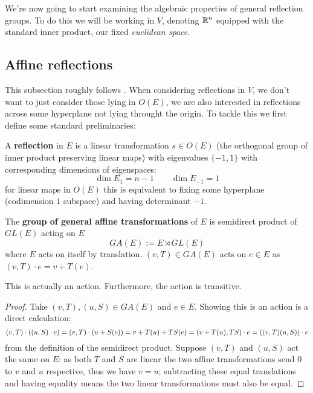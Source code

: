 \documentclass[../main.tex]{subfiles}
\begin{document}
We're now going to start examining the algebraic properties of general reflection groups. To do this we will be working in $V$, denoting $\mathbb{R}^n$ equipped with the standard inner product, our fixed \textit{euclidean space}.

\subsection{Affine reflections}

This subsection roughly follows \cite{Berger2009}. When considering reflections in $V$, we don't want to just consider those lying in $O(E)$, we are also interested in reflections across some hyperplane not lying throught the origin. To tackle this we first define some standard preliminaries:

\begin{definition}
    A \textbf{reflection} in $E$ is a linear transformation $s\in O(E)$ (the orthogonal group of inner product preserving linear maps) with eigenvalues $\{-1,1\}$ with corresponding dimensions of eigenspaces:\[
        \dim{E_1} = n-1 \qquad \dim{E_{-1}} = 1
    \]
    for linear maps in $O(E)$ this is equivalent to fixing some hyperplane (codimension $1$ subspace) and having determinant $-1$.
\end{definition}

\begin{definition}
    The \textbf{group of general affine transformations} of $E$ is semidirect product of $GL(E)$ acting on $E$\[
    GA(E) := E \rtimes GL(E)
    \] where $E$ acts on itself by translation. $(v,T)\in GA(E)$ acts on $e\in E$ as $(v,T)\cdot e = v + T(e)$.
\end{definition}

\begin{proposition}
    This is actually an action. Furthermore, the action is transitive.
    \begin{proof}
        Take $(v,T), (u,S)\in GA(E)$ and $e\in E$. Showing this is an action is a direct calculation: \[
        (v,T) \cdot \left( (u,S) \cdot e \right) = (v,T)\cdot \left( u + S(e) \right) = v + T(u) + TS(e) = (v+T(u),TS)\cdot e = \left( (v,T)(u,S) \right)\cdot e\]
        from the definition of the semidirect product. Suppose $(v,T)$ and $(u,S)$ act the same on $E$: as both $T$ and $S$ are linear the two affine transformations send $0$ to $v$ and $u$ respective, thus we have $v=u$; subtracting these equal translations and having equality means the two linear transformations must also be equal.
    \end{proof}
\end{proposition}
\end{document}
